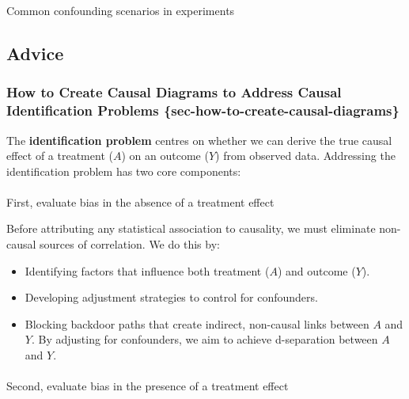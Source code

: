 \documentclass[
  single column]{article}
\makeatletter
\let\oldparagraph\paragraph
\renewcommand{\paragraph}{
    \@ifstar
      \xxxParagraphStar
      \xxxParagraphNoStar
  }
\newcommand{\xxxParagraphStar}[1]{\oldparagraph*{#1}\mbox{}}
\newcommand{\xxxParagraphNoStar}[1]{\oldparagraph{#1}\mbox{}}
\providecommand{\tightlist}{%
  \setlength{\itemsep}{0pt}\setlength{\parskip}{0pt}}\usepackage{longtable,booktabs,array}
\makeatother
\begin{document}
\begin{table}

\caption{\label{tbl-experiments}Common confounding scenarios in
experiments}

\centering{

\pearltable

}

\end{table}%

\newpage{}

\subsection{Advice}\label{advice}

\subsubsection{How to Create Causal Diagrams to Address Causal
Identification Problems
\{sec-how-to-create-causal-diagrams\}}\label{how-to-create-causal-diagrams-to-address-causal-identification-problems-sec-how-to-create-causal-diagrams}

The \textbf{identification problem} centres on whether we can derive the
true causal effect of a treatment (\(A\)) on an outcome (\(Y\)) from
observed data. Addressing the identification problem has two core
components:

\paragraph{First, evaluate bias in the absence of a treatment
effect}\label{first-evaluate-bias-in-the-absence-of-a-treatment-effect}

Before attributing any statistical association to causality, we must
eliminate non-causal sources of correlation. We do this by:

\begin{itemize}
\tightlist
\item
  Identifying factors that influence both treatment (\(A\)) and outcome
  (\(Y\)).
\item
  Developing adjustment strategies to control for confounders.
\item
  Blocking backdoor paths that create indirect, non-causal links between
  \(A\) and \(Y\). By adjusting for confounders, we aim to achieve
  d-separation between \(A\) and \(Y\).
\end{itemize}

\paragraph{Second, evaluate bias in the presence of a treatment
effect}\label{second-evaluate-bias-in-the-presence-of-a-treatment-effect}
\end{document}
